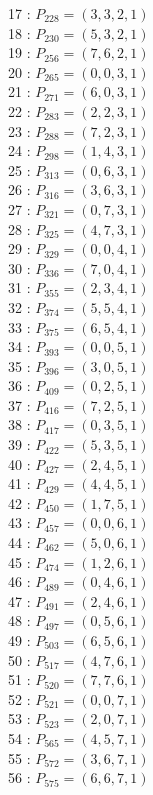 \documentclass{article}
\begin{document}
{\begin{multicols}{3}
17 : $P_{228}=( 3, 3, 2, 1 )$\\
18 : $P_{230}=( 5, 3, 2, 1 )$\\
19 : $P_{256}=( 7, 6, 2, 1 )$\\
20 : $P_{265}=( 0, 0, 3, 1 )$\\
21 : $P_{271}=( 6, 0, 3, 1 )$\\
22 : $P_{283}=( 2, 2, 3, 1 )$\\
23 : $P_{288}=( 7, 2, 3, 1 )$\\
24 : $P_{298}=( 1, 4, 3, 1 )$\\
25 : $P_{313}=( 0, 6, 3, 1 )$\\
26 : $P_{316}=( 3, 6, 3, 1 )$\\
27 : $P_{321}=( 0, 7, 3, 1 )$\\
28 : $P_{325}=( 4, 7, 3, 1 )$\\
29 : $P_{329}=( 0, 0, 4, 1 )$\\
30 : $P_{336}=( 7, 0, 4, 1 )$\\
31 : $P_{355}=( 2, 3, 4, 1 )$\\
32 : $P_{374}=( 5, 5, 4, 1 )$\\
33 : $P_{375}=( 6, 5, 4, 1 )$\\
34 : $P_{393}=( 0, 0, 5, 1 )$\\
35 : $P_{396}=( 3, 0, 5, 1 )$\\
36 : $P_{409}=( 0, 2, 5, 1 )$\\
37 : $P_{416}=( 7, 2, 5, 1 )$\\
38 : $P_{417}=( 0, 3, 5, 1 )$\\
39 : $P_{422}=( 5, 3, 5, 1 )$\\
40 : $P_{427}=( 2, 4, 5, 1 )$\\
41 : $P_{429}=( 4, 4, 5, 1 )$\\
42 : $P_{450}=( 1, 7, 5, 1 )$\\
43 : $P_{457}=( 0, 0, 6, 1 )$\\
44 : $P_{462}=( 5, 0, 6, 1 )$\\
45 : $P_{474}=( 1, 2, 6, 1 )$\\
46 : $P_{489}=( 0, 4, 6, 1 )$\\
47 : $P_{491}=( 2, 4, 6, 1 )$\\
48 : $P_{497}=( 0, 5, 6, 1 )$\\
49 : $P_{503}=( 6, 5, 6, 1 )$\\
50 : $P_{517}=( 4, 7, 6, 1 )$\\
51 : $P_{520}=( 7, 7, 6, 1 )$\\
52 : $P_{521}=( 0, 0, 7, 1 )$\\
53 : $P_{523}=( 2, 0, 7, 1 )$\\
54 : $P_{565}=( 4, 5, 7, 1 )$\\
55 : $P_{572}=( 3, 6, 7, 1 )$\\
56 : $P_{575}=( 6, 6, 7, 1 )$\\
\end{multicols}


}
\end{document}
